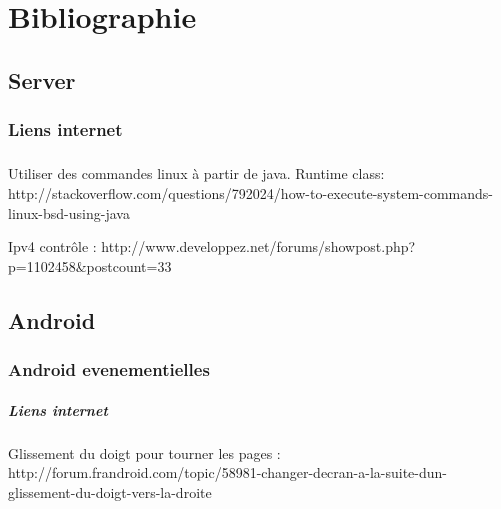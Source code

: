 \chapter*{Bibliographie}

\section{Server}
\subsection{Liens internet}
\paragraph{}
\begin{description}
\item \textnormal{Utiliser des commandes linux à partir de java. Runtime class: 
http://stackoverflow.com/questions/792024/how-to-execute-system-commands-linux-bsd-using-java}

\item \textnormal{Ipv4 contrôle : 
http://www.developpez.net/forums/showpost.php?p=1102458\&postcount=33}

\end{description}
\section{Android}
\subsection{Android evenementielles}
\paragraph{Liens internet}
\begin{description}
\item \textnormal{Glissement du doigt pour tourner les pages : http://forum.frandroid.com/topic/58981-changer-decran-a-la-suite-dun-glissement-du-doigt-vers-la-droite}
\end{description}
